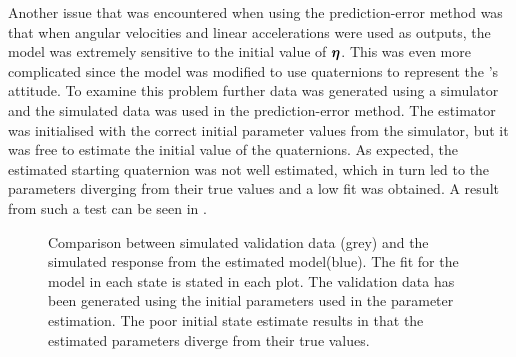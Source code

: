 Another issue that was encountered when using the prediction-error method was that when angular velocities and linear accelerations were used as outputs, the model was extremely sensitive to the initial value of $\boldsymbol{\eta}$. This was even more complicated since the model was modified to use quaternions to represent the \abbrROV's attitude. To examine this problem further data was generated using a simulator and the simulated data was used in the prediction-error method. The estimator was initialised with the correct initial parameter values from the simulator, but it was free to estimate the initial value of the quaternions. As expected, the estimated starting quaternion was not well estimated, which in turn led to the parameters diverging from their true values and a low fit was obtained. A result from such a test can be seen in .

\begin{figure}[htbp]
  \centering %
  \qquad
  \qquad
    \qquad
    \qquad
    \qquad
  \caption{\label{fig:angVelSim}%
    Comparison between simulated validation data (grey) and the simulated response from the estimated model(blue). The fit for the model in each state is stated in each plot. The validation data has been generated using the initial parameters used in the parameter estimation. The poor initial state estimate results in that the estimated parameters diverge from their true values.}
\end{figure}

